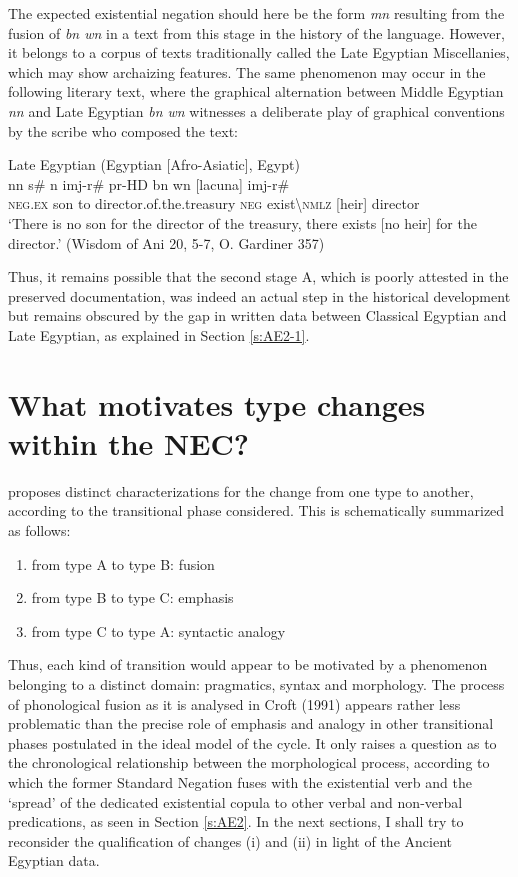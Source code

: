 \documentclass[output=paper]{langsci/langscibook}
\begin{document}
The expected existential negation should here be the form \textit{mn} resulting from the fusion of \textit{bn wn} in a text from this stage in the history of the language. However, it belongs to a corpus of texts traditionally called the Late Egyptian Miscellanies, which may show archaizing features. The same phenomenon may occur in the following literary text, where the graphical alternation between Middle Egyptian \textit{nn} and Late Egyptian \textit{bn wn} witnesses a deliberate play of graphical conventions by the scribe who composed the text:  
 
\ea Late Egyptian (Egyptian [Afro-Asiatic], Egypt) \label{ex:AE52}\\
    \gll nn s\# n imj-r\# pr-HD bn wn [lacuna] imj-r\#\\ 
    \textsc{neg.ex} son to director.of.the.treasury \textsc{neg} exist\textbackslash\textsc{nmlz} [heir] director\\ 
    \glt ‘There is no son for the director of the treasury, there exists [no heir] for the director.’ (Wisdom of Ani 20, 5-7, O. Gardiner 357) 
\z 

Thus, it remains possible that the second stage A, which is poorly attested in the preserved documentation, was indeed an actual step in the historical development but remains obscured by the gap in written data between Classical Egyptian and Late Egyptian, as explained in Section \ref{s:AE2-1}.  

\section{What motivates type changes within the NEC?}\label{s:AE4}

\citet{Croft1991} proposes distinct characterizations for the change from one type to another, according to the transitional phase considered. This is schematically summarized as follows: 

\begin{enumerate}[label=(\roman*)]
    \item from type A to type B: fusion 
    \item from type B to type C: emphasis 
    \item from type C to type A: syntactic analogy 
\end{enumerate}

Thus, each kind of transition would appear to be motivated by a phenomenon belonging to a distinct domain: pragmatics, syntax and morphology. The process of phonological fusion as it is analysed in Croft (1991) appears rather less problematic than the precise role of emphasis and analogy in other transitional phases postulated in the ideal model of the cycle. It only raises a question as to the chronological relationship between the morphological process, according to which the former Standard Negation fuses with the existential verb and the ‘spread’ of the dedicated existential copula to other verbal and non-verbal predications, as seen in Section \ref{s:AE2}. In the next sections, I shall try to reconsider the qualification of changes (i) and (ii) in light of the Ancient Egyptian data.  
\end{document}
